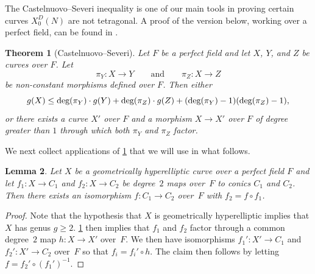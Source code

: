 \documentclass[11pt,reqno]{amsart}
\newtheorem{theorem}{Theorem}[section]
\newtheorem{lemma}[theorem]{Lemma}
\theoremstyle{definition}
\begin{document}
The Castelnuovo--Severi inequality is one of our main tools in proving certain curves $X_0^D(N)$ are not tetragonal. A proof of the version below, working over a perfect field, can be found in \cite[Theorem 14]{KS24}.

\begin{theorem}[Castelnuovo--Severi]\label{theorem: CS}
Let $F$ be a perfect field and let $X$, $Y$, and $Z$ be curves over $F$. Let
\[
\pi_Y\colon X \to Y\qquad\text{and} \qquad \pi_Z\colon X \to Z
\]
be non-constant morphisms defined over $F$. Then either
\[
g(X) \leq \textnormal{deg}(\pi_Y)\cdot g(Y) + \textnormal{deg}(\pi_Z)\cdot g(Z) + (\textnormal{deg}(\pi_Y)-1)(\textnormal{deg}(\pi_Z)-1),
\]
or there exists a curve $X'$ over $F$ and a morphism $X \to X'$ over $F$ of degree greater than $1$ through which both $\pi_Y$ and $\pi_Z$ factor. 
\end{theorem}

We next collect applications of \cref{theorem: CS} that we will use in what follows. 

\begin{lemma}\label{lemma: CS_unique_hyperelliptic}
Let $X$ be a geometrically hyperelliptic curve over a perfect field $F$ and let $f_1 \colon X \to C_1$ and $f_2 \colon X \to C_2$ be degree~$2$ maps over~$F$ to conics $C_1$ and $C_2$. Then there exists an isomorphism $f\colon C_1 \to C_2$ over~$F$ with $f_2 = f \circ f_1$.
\end{lemma}
\begin{proof}
Note that the hypothesis that $X$ is geometrically hyperelliptic implies that $X$ has genus $g \geq 2$. \cref{theorem: CS} then implies that $f_1$ and $f_2$ factor through a common degree~$2$ map $h \colon X \to X'$ over~$F$. We then have isomorphisms $f_1' \colon X' \to C_1$ and $f_2' \colon X' \to C_2$ over~$F$ so that $f_i = f_i' \circ h$. The claim then follows by letting $f = f_2' \circ (f_1')^{-1}$. 
\end{proof}
\end{document}
